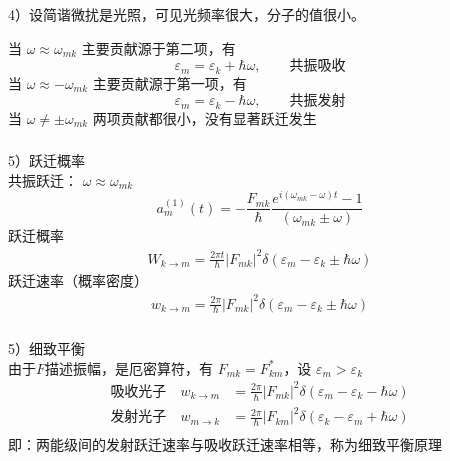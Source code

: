   \begin{frame} 
    \frametitle{}
  4）设简谐微扰是光照，可见光频率很大，分子的值很小。
  \begin{itemize}
    \Item 当 $ \omega \approx \omega _{mk} $ 主要贡献源于第二项，有
    \[ \varepsilon _m = \varepsilon _k + \hbar \omega ,\qquad \text{共振吸收}\]
    \Item 当 $ \omega \approx - \omega _{mk} $ 主要贡献源于第一项，有
    \[ \varepsilon _m = \varepsilon _k - \hbar \omega ,\qquad \text{共振发射}\]
    \Item 当 $ \omega \ne \pm \omega _{mk} $  两项贡献都很小，没有显著跃迁发生
  \end{itemize}
  \end{frame} 

  \begin{frame} 
    \frametitle{}
  5）跃迁概率 \\
  共振跃迁： $ \omega \approx \omega _{mk}$ 
\[ a^{(1)}_m(t)  = - \frac{F_{mk} }{\hbar} \frac{e^ { i(\omega _{mk}  - \omega) t} -1}{(\omega _{mk} \pm  \omega)} \]
跃迁概率 
\begin{equation*}
  \begin{aligned}
    W_{k\to m} =  \frac{2\pi t}{\hbar} \left\vert F_{mk}\right\vert ^2 \delta(\varepsilon _m - \varepsilon _k \pm \hbar \omega)
  \end{aligned}
\end{equation*}
跃迁速率（概率密度）
\begin{equation*}
  \begin{aligned}
    w_{k\to m} = \frac{2\pi }{\hbar} \left\vert F_{mk} \right\vert ^2 \delta(\varepsilon _m - \varepsilon _k \pm \hbar \omega)
  \end{aligned}
\end{equation*}
  \end{frame} 

\begin{frame} 
  \frametitle{}
  5）细致平衡 \\
  由于$F$描述振幅，是厄密算符，有 $F_{mk} = F^* _{km} $，设 $\varepsilon _m > \varepsilon _ k$\\
  \begin{equation*}
    \begin{aligned}
    \text{吸收光子} \quad  w_{k\to m} &= \frac{2\pi }{\hbar} \left\vert F_{mk}\right\vert ^2 \delta(\varepsilon _m - \varepsilon _k - \hbar \omega) \\
    \text{发射光子} \quad w_{m\to k} &= \frac{2\pi }{\hbar} \left\vert F_{km}\right\vert ^2 \delta(\varepsilon _k - \varepsilon _m + \hbar \omega) \\
    \end{aligned}
  \end{equation*}
  即：两能级间的发射跃迁速率与吸收跃迁速率相等，称为细致平衡原理
\end{frame} 

